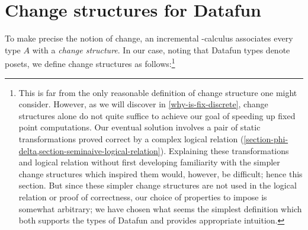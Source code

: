 \section{Change structures for Datafun}
\label{section-change-structures}

To make precise the notion of change, an incremental \fn-calculus associates every type $A$ with a \emph{change structure}. In our case, noting that Datafun types denote posets, we define change structures as follows:\footnote{%
This is far from the only reasonable definition of change structure one might consider. 
%
However, as we will discover in \cref{why-is-fix-discrete}, change structures alone do not quite suffice to achieve our goal of speeding up fixed point computations.
%
Our eventual solution involves a pair of static transformations proved correct by a complex logical relation (\cref{section-phi-delta,section-seminaive-logical-relation}).
%
Explaining these transformations and logical relation without first developing familiarity with the simpler change structures which inspired them would, however, be difficult; hence this section.
%
But since these simpler change structures are not used in the logical relation or proof of correctness, our choice of properties to impose is somewhat arbitrary; we have chosen what seems the simplest definition which both supports the types of Datafun and provides appropriate intuition.%
%
%
}

